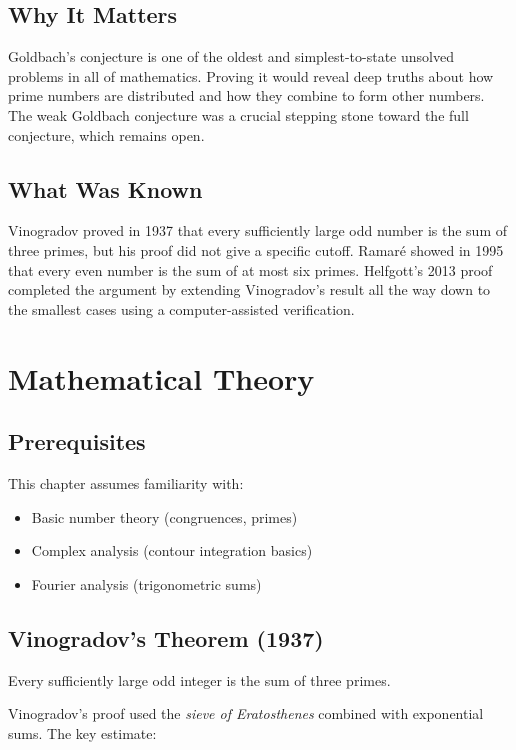 \subsection{Why It Matters}
Goldbach's conjecture is one of the oldest and simplest-to-state unsolved problems in all of mathematics. Proving it would reveal deep truths about how prime numbers are distributed and how they combine to form other numbers. The weak Goldbach conjecture was a crucial stepping stone toward the full conjecture, which remains open.

\subsection{What Was Known}
Vinogradov proved in 1937 that every sufficiently large odd number is the sum of three primes, but his proof did not give a specific cutoff. Ramar\'e showed in 1995 that every even number is the sum of at most six primes. Helfgott's 2013 proof completed the argument by extending Vinogradov's result all the way down to the smallest cases using a computer-assisted verification.

\section{Mathematical Theory}


\subsection{Prerequisites}
This chapter assumes familiarity with:
\begin{itemize}
\item Basic number theory (congruences, primes)
\item Complex analysis (contour integration basics)
\item Fourier analysis (trigonometric sums)
\end{itemize}

\subsection{Vinogradov's Theorem (1937)}

\begin{theorem}
Every sufficiently large odd integer is the sum of three primes.
\end{theorem}

Vinogradov's proof used the \emph{sieve of Eratosthenes} combined with exponential sums. The key estimate:

